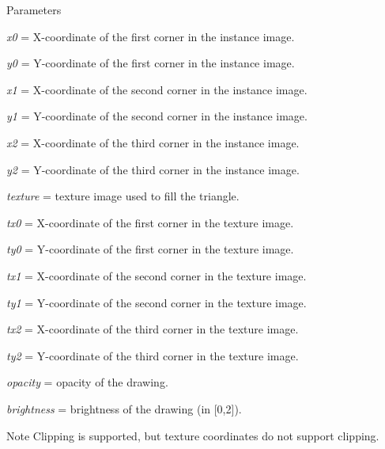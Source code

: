 \begin{DoxyParams}{Parameters}
\item[{\em x0}]= X-\/coordinate of the first corner in the instance image. \item[{\em y0}]= Y-\/coordinate of the first corner in the instance image. \item[{\em x1}]= X-\/coordinate of the second corner in the instance image. \item[{\em y1}]= Y-\/coordinate of the second corner in the instance image. \item[{\em x2}]= X-\/coordinate of the third corner in the instance image. \item[{\em y2}]= Y-\/coordinate of the third corner in the instance image. \item[{\em texture}]= texture image used to fill the triangle. \item[{\em tx0}]= X-\/coordinate of the first corner in the texture image. \item[{\em ty0}]= Y-\/coordinate of the first corner in the texture image. \item[{\em tx1}]= X-\/coordinate of the second corner in the texture image. \item[{\em ty1}]= Y-\/coordinate of the second corner in the texture image. \item[{\em tx2}]= X-\/coordinate of the third corner in the texture image. \item[{\em ty2}]= Y-\/coordinate of the third corner in the texture image. \item[{\em opacity}]= opacity of the drawing. \item[{\em brightness}]= brightness of the drawing (in \mbox{[}0,2\mbox{]}). \end{DoxyParams}
\begin{DoxyNote}{Note}
Clipping is supported, but texture coordinates do not support clipping. 
\end{DoxyNote}
